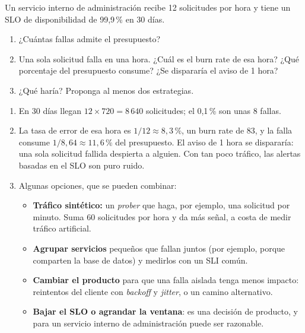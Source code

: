 \documentclass[variant=guia,cover=institutional,mode=screen]{ua-engineering-v6-article}
\begin{document}
\begin{uaexercise}
Un servicio interno de administración recibe 12 solicitudes por hora y tiene un SLO de disponibilidad de 99,9\,\% en 30 días.
\begin{enumerate}
\item ¿Cuántas fallas admite el presupuesto?
\item Una sola solicitud falla en una hora. ¿Cuál es el burn rate de esa hora? ¿Qué porcentaje del presupuesto consume? ¿Se dispararía el aviso de 1 hora?
\item ¿Qué haría? Proponga al menos dos estrategias.
\end{enumerate}
\end{uaexercise}
\begin{uaanswer}
\begin{enumerate}
\item En 30 días llegan $12 \times 720 = 8\,640$ solicitudes; el 0,1\,\% son unas 8 fallas.
\item La tasa de error de esa hora es $1/12 \approx 8{,}3\,\%$, un burn rate de 83, y la falla consume $1 / 8{,}64 \approx 11{,}6\,\%$ del presupuesto. El aviso de 1 hora se dispararía: una sola solicitud fallida despierta a alguien. Con tan poco tráfico, las alertas basadas en el SLO son puro ruido.
\item Algunas opciones, que se pueden combinar:
\begin{itemize}
\item \textbf{Tráfico sintético:} un \emph{prober} que haga, por ejemplo, una solicitud por minuto. Suma 60 solicitudes por hora y da más señal, a costa de medir tráfico artificial.
\item \textbf{Agrupar servicios} pequeños que fallan juntos (por ejemplo, porque comparten la base de datos) y medirlos con un SLI común.
\item \textbf{Cambiar el producto} para que una falla aislada tenga menos impacto: reintentos del cliente con \emph{backoff} y \emph{jitter}, o un camino alternativo.
\item \textbf{Bajar el SLO o agrandar la ventana}: es una decisión de producto, y para un servicio interno de administración puede ser razonable.
\end{itemize}
\end{enumerate}
\end{uaanswer}
\end{document}
